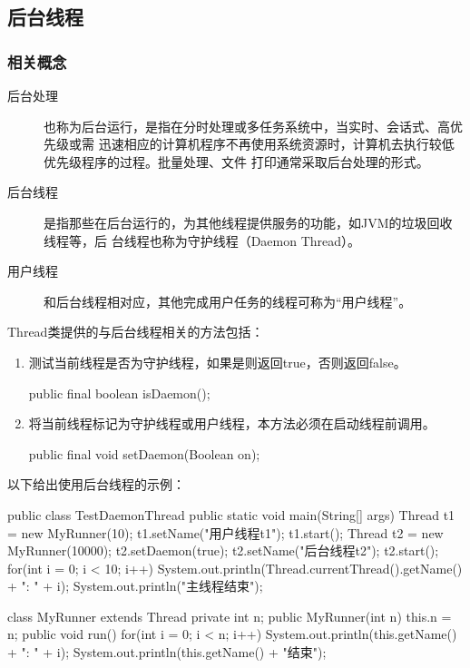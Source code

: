 \subsection{后台线程}

\subsubsection{相关概念}
\begin{description}
\item[后台处理] 也称为后台运行，是指在分时处理或多任务系统中，当实时、会话式、高优先级或需
迅速相应的计算机程序不再使用系统资源时，计算机去执行较低优先级程序的过程。批量处理、文件
打印通常采取后台处理的形式。
\item[后台线程] 是指那些在后台运行的，为其他线程提供服务的功能，如JVM的垃圾回收线程等，后
台线程也称为守护线程（Daemon Thread）。
\item[用户线程] 和后台线程相对应，其他完成用户任务的线程可称为“用户线程”。
\end{description}

Thread类提供的与后台线程相关的方法包括：

\begin{enumerate}
\item 测试当前线程是否为守护线程，如果是则返回true，否则返回false。
\begin{javaCode}
public final boolean isDaemon();
\end{javaCode}
\item 将当前线程标记为守护线程或用户线程，本方法必须在启动线程前调用。
\begin{javaCode}
public final void setDaemon(Boolean on);
\end{javaCode}
\end{enumerate}

以下给出使用后台线程的示例：


\begin{javaCode}
public class TestDaemonThread {
  public static void main(String[] args) {
    Thread t1 = new MyRunner(10);
    t1.setName("用户线程t1");
    t1.start();
    Thread t2 = new MyRunner(10000);
    t2.setDaemon(true);
    t2.setName("后台线程t2");
    t2.start();
    for(int i = 0; i < 10; i++) {
      System.out.println(Thread.currentThread().getName() + ": " + i);
    }
    System.out.println("主线程结束");
  }
}

class MyRunner extends Thread {
  private int n;
  public MyRunner(int n) {
    this.n = n;
  }
  public void run() {
    for(int i = 0; i < n; i++) {
      System.out.println(this.getName() + ": " + i);
    }
    System.out.println(this.getName() + "结束");
  }
}  
\end{javaCode}


